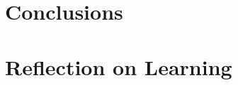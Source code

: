 \documentclass[12pt]{report}
\begin{document}
\section{Conclusions}\label{Conclusions}

\section{Reflection on Learning}\label{Reflection}
\end{document}
